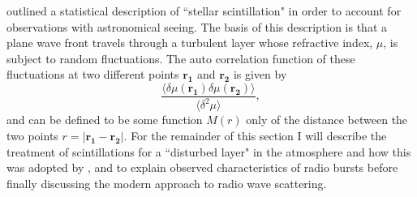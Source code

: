 \cite{Chandrasekhar1952} outlined a statistical description of ``stellar scintillation" in order to account for observations with astronomical seeing.  The basis of this description is that a plane wave front travels through a turbulent layer whose refractive index, $\mu$, is subject to random fluctuations. The auto correlation function of these fluctuations at two different points $\mathbf{r_1}$ and $\mathbf{r_2}$ is given by
$$
\frac{\langle \delta \mu(\mathbf{r_1}) \delta \mu(\mathbf{r_2}) \rangle}{\langle \delta^2 \mu \rangle}, 
$$
and can be defined to be some function $M(r)$ only of the distance between the two points $r = \vert \mathbf{r_1} - \mathbf{r_2} \vert$. For the remainder of this section I will describe the \cite{Chandrasekhar1952} treatment of scintillations for a ``disturbed layer" in the atmosphere and how this was adopted by \cite{Fokker1965}, \cite{Steinberg1971} and \cite{Riddle1974} to explain observed characteristics of radio bursts before finally discussing the modern approach to radio wave scattering.

